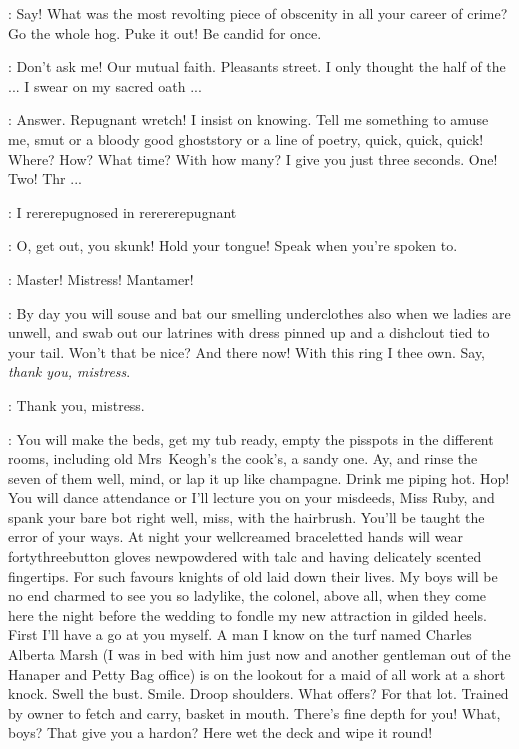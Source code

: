 \Bello:
Say!
What was the most revolting piece of obscenity in all your career of crime?
Go the whole hog.
Puke it out!
Be candid for once.


\Bloom:
Don't ask me!
Our mutual faith.
Pleasants street.
I only thought the half of the ...
I swear on my sacred oath ...%

\Bello:
Answer.
Repugnant wretch!
I insist on knowing.
Tell me something to amuse me, smut or a bloody good ghoststory
or a line of poetry, quick, quick, quick!
Where? How?
What time?
With how many?
I give you just three seconds.
One! Two! Thr ...

\Bloom:
I rererepugnosed in rerererepugnant

\Bello:
O, get out, you skunk!
Hold your tongue!
Speak when you're spoken to.%

\Bloom:
Master!
Mistress!
Mantamer!


\Bello:
By day you will souse and bat our smelling underclothes
also when we ladies are unwell, and swab out our latrines
with dress pinned up and a dishclout tied to your tail.
Won't that be nice?
And there now!
With this ring I thee own.
Say, \emph{thank you, mistress}.

\Bloom:
Thank you, mistress.

\Bello:
You will make the beds, get my tub ready,
empty the pisspots in the different rooms,
including old Mrs~Keogh's the cook's, a sandy one.
Ay, and rinse the seven of them well, mind, or lap it up like champagne.
Drink me piping hot.
Hop!
You will dance attendance or I'll lecture you on your misdeeds,
Miss Ruby, and spank your bare bot right well, miss,
with the hairbrush.
You'll be taught the error of your ways.
At night your wellcreamed braceletted hands will wear fortythreebutton gloves
newpowdered with talc and having delicately scented fingertips.
For such favours knights of old laid down their lives.
My boys will be no end charmed to see you so ladylike,
the colonel, above all,
when they come here the night before the wedding
to fondle my new attraction in gilded heels.
First I'll have a go at you myself.
A man I know on the turf named Charles Alberta Marsh
(I was in bed with him just now
and another gentleman out of the Hanaper and Petty Bag office)
is on the lookout for a maid of all work at a short knock.
Swell the bust.
Smile.
Droop shoulders.
What offers?
For that lot.
Trained by owner to fetch and carry, basket in mouth.
There's fine depth for you!
What, boys?
That give you a hardon?
Here wet the deck and wipe it round!


